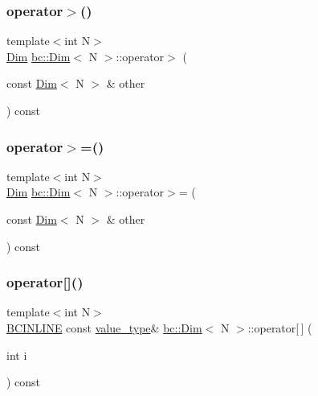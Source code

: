 \mbox{\label{structbc_1_1Dim_a2b626d552fe3b4a486b4f5456ba0acc1}} 
\subsubsection{\texorpdfstring{operator$>$()}{operator>()}}
{\footnotesize\ttfamily template$<$int N$>$ \\
\hyperlink{structbc_1_1Dim}{Dim} \hyperlink{structbc_1_1Dim}{bc\+::\+Dim}$<$ N $>$\+::operator$>$ (\begin{DoxyParamCaption}\item[{const \hyperlink{structbc_1_1Dim}{Dim}$<$ N $>$ \&}]{other }\end{DoxyParamCaption}) const\hspace{0.3cm}{\ttfamily [inline]}}

\mbox{\label{structbc_1_1Dim_a12b2ad4fd09771c51eca578e80e12ab1}} 
\subsubsection{\texorpdfstring{operator$>$=()}{operator>=()}}
{\footnotesize\ttfamily template$<$int N$>$ \\
\hyperlink{structbc_1_1Dim}{Dim} \hyperlink{structbc_1_1Dim}{bc\+::\+Dim}$<$ N $>$\+::operator$>$= (\begin{DoxyParamCaption}\item[{const \hyperlink{structbc_1_1Dim}{Dim}$<$ N $>$ \&}]{other }\end{DoxyParamCaption}) const\hspace{0.3cm}{\ttfamily [inline]}}

\mbox{\label{structbc_1_1Dim_a2652546104d572e4dc15ad67034f3f96}} 
\subsubsection{\texorpdfstring{operator[]()}{operator[]()}\hspace{0.1cm}{\footnotesize\ttfamily [1/2]}}
{\footnotesize\ttfamily template$<$int N$>$ \\
\hyperlink{common_8h_a6699e8b0449da5c0fafb878e59c1d4b1}{B\+C\+I\+N\+L\+I\+NE} const \hyperlink{structbc_1_1Dim_af59ff554825273cf6bd9619b2c78c196}{value\+\_\+type}\& \hyperlink{structbc_1_1Dim}{bc\+::\+Dim}$<$ N $>$\+::operator\mbox{[}$\,$\mbox{]} (\begin{DoxyParamCaption}\item[{int}]{i }\end{DoxyParamCaption}) const\hspace{0.3cm}{\ttfamily [inline]}}



